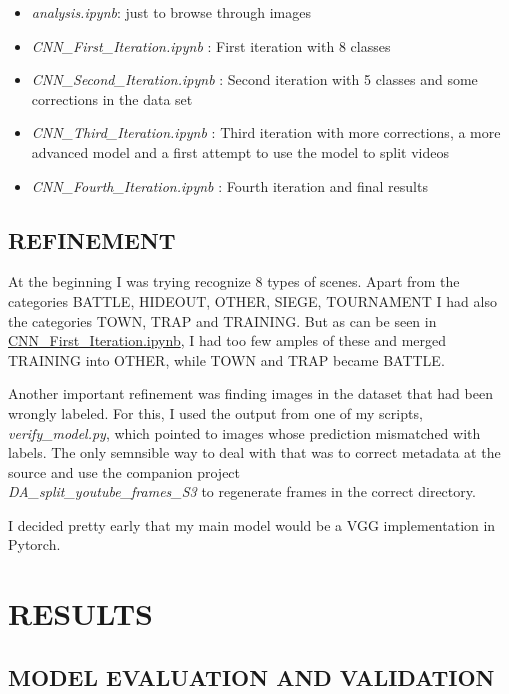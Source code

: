 \documentclass[
]{article}
\providecommand{\tightlist}{%
  \setlength{\itemsep}{0pt}\setlength{\parskip}{0pt}}
\begin{document}
\begin{itemize}
\tightlist
\item
  \emph{analysis.ipynb}: just to browse through images
\item
  \emph{CNN\_First\_Iteration.ipynb} : First iteration with 8 classes
\item
  \emph{CNN\_Second\_Iteration.ipynb} : Second iteration with 5 classes
  and some corrections in the data set
\item
  \emph{CNN\_Third\_Iteration.ipynb} : Third iteration with more
  corrections, a more advanced model and a first attempt to use the
  model to split videos
\item
  \emph{CNN\_Fourth\_Iteration.ipynb} : Fourth iteration and final
  results
\end{itemize}

\hypertarget{refinement}{%
\subsection{REFINEMENT}\label{refinement}}

At the beginning I was trying recognize 8 types of scenes. Apart from
the categories BATTLE, HIDEOUT, OTHER, SIEGE, TOURNAMENT I had also the
categories TOWN, TRAP and TRAINING. But as can be seen in
\url{CNN_First_Iteration.ipynb}, I had too few amples of these and
merged TRAINING into OTHER, while TOWN and TRAP became BATTLE.

Another important refinement was finding images in the dataset that had
been wrongly labeled. For this, I used the output from one of my
scripts, \emph{verify\_model.py}, which pointed to images whose
prediction mismatched with labels. The only semnsible way to deal with
that was to correct metadata at the source and use the companion
project\\
\emph{DA\_split\_youtube\_frames\_S3} to regenerate frames in the
correct directory.

I decided pretty early that my main model would be a VGG implementation
in Pytorch.

\hypertarget{results}{%
\section{RESULTS}\label{results}}

\hypertarget{model-evaluation-and-validation}{%
\subsection{MODEL EVALUATION AND
VALIDATION}\label{model-evaluation-and-validation}}
\end{document}
